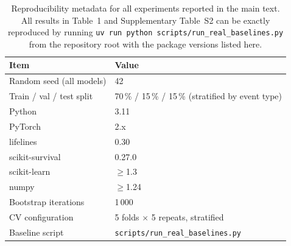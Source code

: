 \documentclass[12pt]{article}
\begin{document}
\begin{table}[htbp]
  \caption{Reproducibility metadata for all experiments reported in the main
    text.  All results in Table~1 and Supplementary Table~S2 can be exactly
    reproduced by running \texttt{uv run python scripts/run\_real\_baselines.py}
    from the repository root with the package versions listed here.}
  \label{tab:repro}
  \centering
  \begin{tabular}{ll}
    \toprule
    \textbf{Item} & \textbf{Value} \\
    \midrule
    Random seed (all models)   & 42 \\
    Train / val / test split   & 70\,\% / 15\,\% / 15\,\% (stratified by event type) \\
    \addlinespace
    Python                     & 3.11 \\
    PyTorch                    & 2.x \\
    lifelines                  & 0.30 \\
    scikit-survival            & 0.27.0 \\
    scikit-learn               & $\geq$1.3 \\
    numpy                      & $\geq$1.24 \\
    \addlinespace
    Bootstrap iterations       & 1\,000 \\
    CV configuration           & 5 folds $\times$ 5 repeats, stratified \\
    Baseline script            & \texttt{scripts/run\_real\_baselines.py} \\
    \bottomrule
  \end{tabular}
\end{table}



\end{document}
